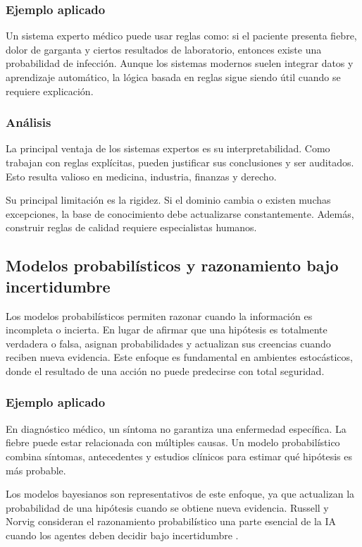 \subsubsection{Ejemplo aplicado}

Un sistema experto médico puede usar reglas como: si el paciente presenta fiebre, dolor de garganta y ciertos resultados de laboratorio, entonces existe una probabilidad de infección. Aunque los sistemas modernos suelen integrar datos y aprendizaje automático, la lógica basada en reglas sigue siendo útil cuando se requiere explicación.

\subsubsection{Análisis}

La principal ventaja de los sistemas expertos es su interpretabilidad. Como trabajan con reglas explícitas, pueden justificar sus conclusiones y ser auditados. Esto resulta valioso en medicina, industria, finanzas y derecho.

Su principal limitación es la rigidez. Si el dominio cambia o existen muchas excepciones, la base de conocimiento debe actualizarse constantemente. Además, construir reglas de calidad requiere especialistas humanos.

\subsection{Modelos probabilísticos y razonamiento bajo incertidumbre}

Los modelos probabilísticos permiten razonar cuando la información es incompleta o incierta. En lugar de afirmar que una hipótesis es totalmente verdadera o falsa, asignan probabilidades y actualizan sus creencias cuando reciben nueva evidencia. Este enfoque es fundamental en ambientes estocásticos, donde el resultado de una acción no puede predecirse con total seguridad.

\subsubsection{Ejemplo aplicado}

En diagnóstico médico, un síntoma no garantiza una enfermedad específica. La fiebre puede estar relacionada con múltiples causas. Un modelo probabilístico combina síntomas, antecedentes y estudios clínicos para estimar qué hipótesis es más probable.

Los modelos bayesianos son representativos de este enfoque, ya que actualizan la probabilidad de una hipótesis cuando se obtiene nueva evidencia. Russell y Norvig consideran el razonamiento probabilístico una parte esencial de la IA cuando los agentes deben decidir bajo incertidumbre \cite{russell2012}.

